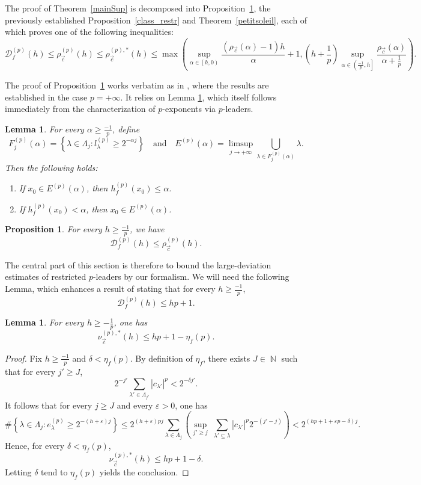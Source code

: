 \documentclass[a4paper,11pt,oneside]{article}
\DeclareMathOperator{\N}{\mathbb{N}}
\newcommand{\coint}[1]{\left[{#1}\right)}
\newcommand{\ocint}[1]{\left({#1}\right]}
\newcommand{\modu}[1]{\left\vert{#1}\right\vert}
\theoremstyle{definition}
\theoremstyle{plain}
\newtheorem{prop}[defi]{Proposition}
\newtheorem{lemma}[defi]{Lemma}
\begin{document}
The proof of  Theorem~\ref{mainSup} is decomposed into Proposition~\ref{spectre_densite}, the previously established Proposition~\ref{class_restr} and Theorem~\ref{petitsoleil}, each of which proves one of the following inequalities:
\[
\mathscr{D}_f^{(p)}(h)\leq 
\rho_{\vec{c}}^{(p)}(h)\leq 
\rho_{\vec{c}}^{(p),\ast}(h)\leq\max\left(\sup_{\alpha\in\coint{h,0}}\frac{(\rho_{\vec{c}}(\alpha)-1)h}{\alpha}+1,\left(h+\frac{1}{p}\right)\sup_{\alpha\in\ocint{\frac{-1}{p},h}}\frac{\rho_{\vec{c}}(\alpha)}{\alpha+\frac{1}{p}}\right).
\]

The proof of Proposition~\ref{spectre_densite} works verbatim as in \cite{largeDev}, where the results are established in the case $p=+\infty$. It relies on Lemma \ref{lm_spectre_densite}, which itself follows immediately from the characterization of $p$-exponents via $p$-leaders.

\begin{lemma}\label{lm_spectre_densite}
For every $\alpha\geq\frac{-1}{p}$, define
\[
F_j^{(p)}(\alpha)=\left\{\lambda\in\Lambda_j:l_\lambda^{(p)}\geq 2^{-\alpha j}\right\} \quad\text{and}\quad E^{(p)}(\alpha)=\limsup_{j\rightarrow+\infty}\bigcup_{\lambda\in F_j^{(p)}(\alpha)}\lambda.
\]
Then
the following holds:
\begin{enumerate}
\item If $x_0\in E^{(p)}(\alpha)$, then $h^{(p)}_f(x_0)\leq \alpha$.
\item If $h_f^{(p)}(x_0)<\alpha$, then $x_0\in E^{(p)}(\alpha)$.
\end{enumerate}
\end{lemma}

\begin{prop}\label{spectre_densite}
For every $h\geq\frac{-1}{p}$, we have
\[
\mathscr{D}^{(p)}_f(h)\leq 
\rho_{\vec{c}}^{(p)}(h).
\]
\end{prop}

The central part of this section is therefore to bound the large-deviation estimates of restricted $p$-leaders by our formalism. We will need the following Lemma, which enhances a result of \cite{pexp2} stating that for every $h\geq\frac{-1}{p}$,
\[
\mathscr{D}^{(p)}_f(h)\leq hp+1.
\]

\begin{lemma}\label{sup_B}
For every $h\geq-\frac1p$, one has
\[
\nu_{\vec{c}}^{(p),*}(h)
\leq hp+1-\eta_f(p).
\]
\end{lemma}
\begin{proof}
Fix $h\geq\frac{-1}{p}$ and $\delta<\eta_f(p)$. By definition of $\eta_f$, there exists $J\in\N$ such that for every $j'\geq J$,
\[
2^{-j'}\sum_{\lambda'\in\Lambda_{j'}}\modu{c_{\lambda'}}^p<2^{-\delta j'}.
\]
It follows that for every $j\geq J$ and every $\varepsilon>0$, one has 
\[
\#\left\{\lambda\in\Lambda_j:e_\lambda^{(p)}\geq 2^{-(h+\varepsilon)j}\right\} \leq 2^{(h+\varepsilon)pj}\sum_{\lambda\in\Lambda_j}\left(\sup_{j'\geq j}\;\sum_{\lambda'\subseteq\lambda}\modu{c_{\lambda'}}^p2^{-(j'-j)}\right)<2^{(hp+1+\varepsilon p-\delta)j}.
\]
Hence, for every $\delta<\eta_f(p)$,
\[
\nu_{\vec{c}}^{(p),*}(h)\leq hp+1-\delta.
\]
Letting $\delta$ tend to $\eta_f(p)$ yields the conclusion.
\end{proof}
\end{document}
